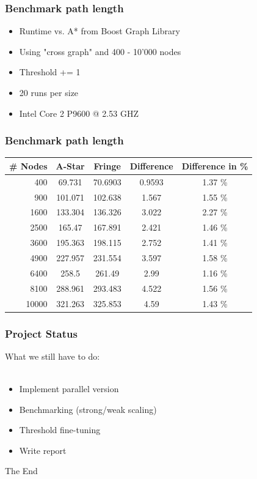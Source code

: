 \documentclass{beamer}
\begin{document}
\begin{frame}
\frametitle{Benchmark path length}
\begin{itemize}
\item Runtime vs. A* from Boost Graph Library
\item Using "cross graph" and 400 - 10'000 nodes
\item Threshold += 1
\item 20 runs per size
\item Intel Core 2 P9600 @ 2.53 GHZ
\end{itemize}
\end{frame}
\begin{frame}
\frametitle{Benchmark path length}
\begin{center}
    \begin{tabular}{ | r | c | c | c | c | }
    \hline
\# \textbf{Nodes}	&	\textbf{A-Star}	&	\textbf{Fringe}	&	\textbf{Difference} & \textbf{Difference in \%} \\ \hline
400		&	69.731	&	70.6903	&	0.9593 & 1.37 \% \\ \hline
900		&	101.071	&	102.638	&	1.567  & 1.55 \%\\ \hline
1600		&	133.304	&	136.326	&	3.022 & 2.27 \% \\ \hline
2500		&	165.47	&	167.891	&	2.421 & 1.46 \% \\ \hline
3600		&	195.363	&	198.115	&	2.752 & 1.41 \% \\ \hline
4900		&	227.957	&	231.554	&	3.597 & 1.58 \% \\ \hline
6400		&	258.5	&	261.49	&	2.99  & 1.16 \% \\ \hline
8100		&	288.961	&	293.483	&	4.522 & 1.56 \% \\ \hline
10000	&	321.263	&	325.853	&	4.59  & 1.43 \% \\ \hline
    \end{tabular}
\end{center}


\end{frame}



\begin{frame}
\frametitle{Project Status}
What we still have to do:\\\quad\\
\begin{itemize}
\item Implement parallel version
\item Benchmarking (strong/weak scaling)
\item Threshold fine-tuning
\item Write report
\end{itemize}
\end{frame}

\begin{frame}
\Huge{\centerline{The End}}
\end{frame}

\end{document}
